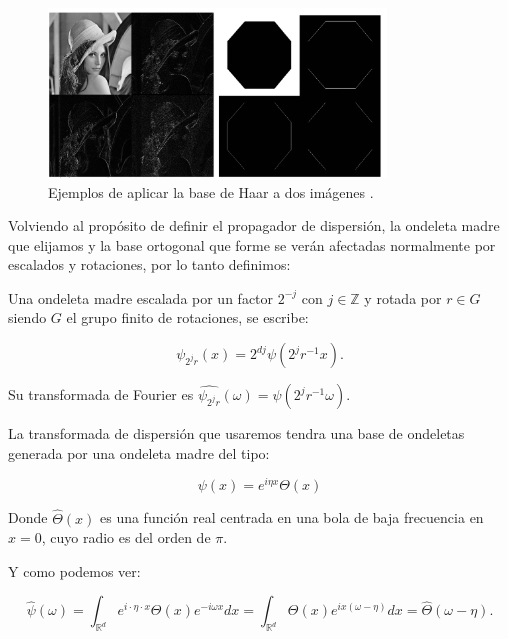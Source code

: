 \begin{figure} [!h]
  \centering
  \includegraphics[width=0.8\textwidth]{img/ejemplos_haar_basis.png}
  \caption{Ejemplos de aplicar la base de Haar a dos imágenes \cite{HaarBasis}.}
  \label{fig:ejemplo_haar}
\end{figure}

\medskip 

\noindent Volviendo al propósito de definir el propagador de dispersión, la ondeleta madre que elijamos y la base ortogonal que forme se verán afectadas normalmente por escalados y rotaciones, por lo tanto definimos: 

\begin{definicion}
  Una ondeleta madre escalada por un factor $2^{-j}$ con $j \in \mathbb{Z}$ y rotada por $r \in G$ siendo $G$ el grupo finito de rotaciones, se escribe: 

  $$\psi_{2^j r}(x)=2^{dj} \psi(2^j r^{-1} x).$$
\end{definicion}


\medskip

\noindent Su transformada de Fourier es $\widehat{\psi_{2^j r}}(\omega)=\widehat{\psi}(2^j r^{-1} \omega)$.

\medskip

\noindent La transformada de dispersión que usaremos tendra una base de ondeletas generada por una ondeleta madre del tipo:

$$\psi(x)=e^{i\eta x} \Theta(x)$$

\noindent Donde $\widehat{\Theta}(x)$ es una función real centrada en una bola de baja frecuencia en $x=0$, cuyo radio es del orden de $\pi$.

\medskip

\noindent Y como podemos ver:

\begin{equation}
  \widehat{\psi}(\omega)=\int_{\mathbb{R}^d}e^{i\cdot \eta \cdot  x} \Theta(x) e^{-i\omega x} dx=\int_{\mathbb{R}^d}\Theta(x) e^{ix(\omega-\eta)} dx=\widehat{\Theta}(\omega-\eta).
\end{equation}


